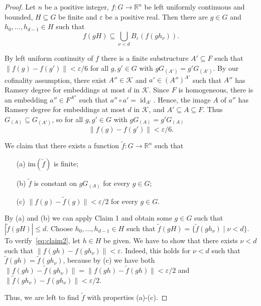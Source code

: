 \documentclass[12pt]{amsart}
\theoremstyle{plain}
\theoremstyle{definition}
\begin{document}
\begin{proof}
 Let $n$ be a positive integer, $f:G\to \mathbb R^n$ be left uniformly continuous and bounded, $H\subseteq G$ be finite and $\varepsilon$ be a positive real.
Then there are $g\in G$ and $h_0,\ldots,h_{d-1}\in H$ such that 
\begin{equation}\label{eq:claim2}
\textstyle
f(gH)\subseteq \bigcup_{\nu<d}B_{\varepsilon}(f(gh_\nu)).
\end{equation}

 By left uniform continuity of $f$ there is a finite substructure  
$A'\subseteq F$ such that $\|f(g)- f(g')\|<\varepsilon/6$ for all $g,g'\in G$ with $gG_{(A')}=g'G_{(A')}$. 
By our cofinality assumption, there exist $A''\in{\mathcal K}$ and $a'\in (A'')^{A'}$ such that $A''$ 
has Ramsey degree for embeddings at most $d$ in ${\mathcal K}$. Since $F$ is homogeneous, there is an embedding $a''\in F^{A''}$ such that $a''\circ a'=\operatorname{id}_{A'}$. Hence, the image $A$ of $a''$ has Ramsey degree for embeddings at most $d$ in ${\mathcal K}$, and $A'\subseteq A\subseteq F$. Thus $G_{(A)}\subseteq G_{(A')}$, so
for all $g,g'\in G$ with $gG_{(A)}=g'G_{(A)}$
\begin{equation}\label{eq:A}
\|f(g)- f(g')\|<\varepsilon/6.
\end{equation}

We claim that there exists a function $\tilde f:G\to \mathbb R^n$ such that
\begin{enumerate}\itemsep=0pt
\item[(a)] ${\mathrm{im}}(\tilde f)$ is finite;
\item[(b)] $\tilde f$ is constant on $gG_{(A)}$ for every $g\in G$;
\item[(c)] $\|f(g)-\tilde f(g)\|<\varepsilon/2$ for every $g\in G$.
\end{enumerate}
By (a) and (b) we can apply Claim 1 and obtain some $g\in G$ such that $|\tilde f(gH)|\le d$. Choose $h_0,\ldots, h_{d-1}\in H$
such that $\tilde f(gH)=\{\tilde f(gh_\nu) \mid \nu<d\}$. To verify~\eqref{eq:claim2}, let $h\in H$ be given.
We have to show that there exists $\nu<d$ such that  
$\|f(gh)-f(gh_\nu)\|<\varepsilon$. Indeed, this holds for $\nu<d$ such that $\tilde f(gh)=\tilde f(gh_\nu)$, because by (c) 
we have both $\|f(gh)-\tilde f(gh_\nu)\|=\|f(gh)-\tilde f(gh)\|<\varepsilon/2$ and
$\|\tilde f(gh_\nu)-f(gh_\nu)\|<\varepsilon/2$.

Thus, we are left to find $\tilde f$ with properties (a)-(c).


\end{proof}
\end{document}
